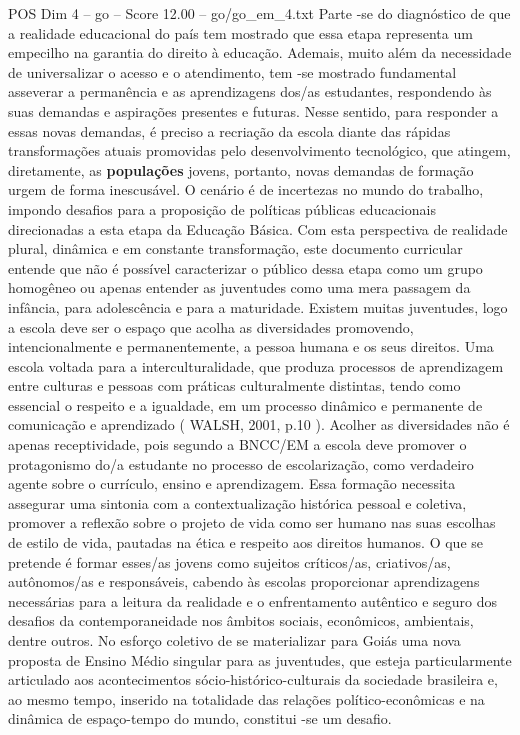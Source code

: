\begin{textsample}{POS Dim 4 – go – Score 12.00 – go/go\_em\_4.txt}
Parte -se do diagnóstico de que a realidade educacional do país tem mostrado que essa etapa representa um empecilho na garantia do direito à educação.
Ademais, muito além da necessidade de universalizar o acesso e o atendimento, tem -se mostrado fundamental asseverar a permanência e as aprendizagens dos/as estudantes, respondendo às suas demandas e aspirações presentes e futuras.
Nesse sentido, para responder a essas novas demandas, é preciso a recriação da escola diante das rápidas transformações atuais promovidas pelo desenvolvimento tecnológico, que atingem, diretamente, as \textbf{populações} jovens, portanto, novas demandas de formação urgem de forma inescusável.
O cenário é de incertezas no mundo do trabalho, impondo desafios para a proposição de políticas públicas educacionais direcionadas a esta etapa da Educação Básica.
Com esta perspectiva de realidade plural, dinâmica e em constante transformação, este documento curricular entende que não é possível caracterizar o público dessa etapa como um grupo homogêneo ou apenas entender as juventudes como uma mera passagem da infância, para adolescência e para a maturidade.
Existem muitas juventudes, logo a escola deve ser o espaço que acolha as diversidades promovendo, intencionalmente e permanentemente, a pessoa humana e os seus direitos.
Uma escola voltada para a interculturalidade, que produza processos de aprendizagem entre culturas e pessoas com práticas culturalmente distintas, tendo como essencial o respeito e a igualdade, em um processo dinâmico e permanente de comunicação e aprendizado ( WALSH, 2001, p.10 ).
Acolher as diversidades não é apenas receptividade, pois segundo a BNCC/EM a escola deve promover o protagonismo do/a estudante no processo de escolarização, como verdadeiro agente sobre o currículo, ensino e aprendizagem.
Essa formação necessita assegurar uma sintonia com a contextualização histórica pessoal e coletiva, promover a reflexão sobre o projeto de vida como ser humano nas suas escolhas de estilo de vida, pautadas na ética e respeito aos direitos humanos.
O que se pretende é formar esses/as jovens como sujeitos críticos/as, criativos/as, autônomos/as e responsáveis, cabendo às escolas proporcionar aprendizagens necessárias para a leitura da realidade e o enfrentamento autêntico e seguro dos desafios da contemporaneidade nos âmbitos sociais, econômicos, ambientais, dentre outros.
No esforço coletivo de se materializar para Goiás uma nova proposta de Ensino Médio singular para as juventudes, que esteja particularmente articulado aos acontecimentos sócio-histórico-culturais da sociedade brasileira e, ao mesmo tempo, inserido na totalidade das relações político-econômicas e na dinâmica de espaço-tempo do mundo, constitui -se um desafio.

\end{textsample}

